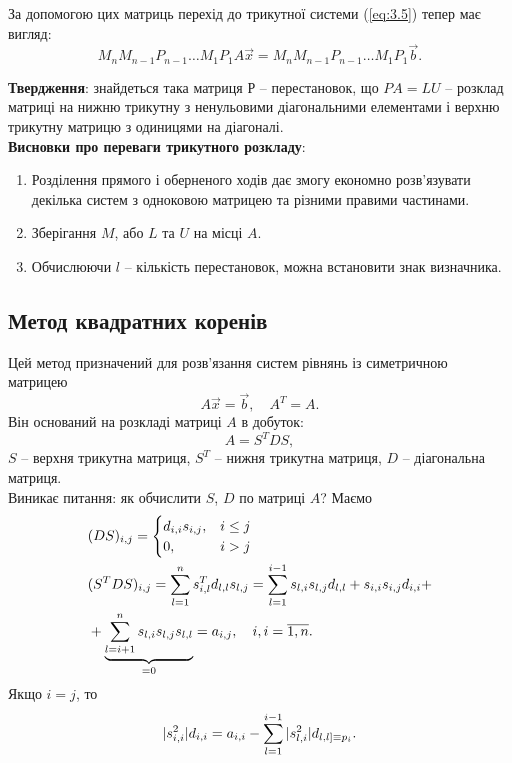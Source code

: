 За допомогою цих матриць перехід до трикутної системи (\ref{eq:3.5}) тепер має вигляд: \[ M_n M_{n-1} P_{n-1} \ldots M_1 P_1 A \vec x = M_n M_{n-1} P_{n-1} \ldots M_1 P_1 \vec b. \]

\textbf{Твердження}: знайдеться така матриця $Р$ -- перестановок, що $PA = LU$ -- розклад матриці на нижню трикутну з ненульовими діагональними елементами і верхню трикутну матрицю з одиницями на діагоналі. \\

\textbf{Висновки про переваги трикутного розкладу}:
\begin{enumerate}
	\item Розділення прямого і оберненого ходів дає змогу економно розв'язувати декілька систем з одноковою матрицею та різними правими частинами.
	\item Зберігання $M$, або $L$ та $U$ на місці $A$.
	\item Обчислюючи $l$ -- кількість перестановок, можна встановити знак визначника.
\end{enumerate}

\subsection{Метод квадратних коренів}
Цей метод призначений для розв'язання систем рівнянь із симетричною матрицею
\begin{equation}
	\label{eq:3.6}
	A \vec x = \vec b, \quad A^T = A.
\end{equation}
Він оснований на розкладі матриці $A$ в добуток:
\begin{equation}
	\label{eq:3.7}
	A = S^T D S,
\end{equation}
$S$ -- верхня трикутна матриця, $S^T$ -- нижня трикутна матриця, $D$ -- діагональна матриця. \\

Виникає питання: як обчислити $S$, $D$ по матриці $A$? Маємо
\begin{equation}
	\label{eq:3.8}
	\begin{aligned}
		& (DS)_{i,j} = \begin{cases} d_{i,i}s_{i,j}, & i \le j \\ 0, & i > j \end{cases} \\
		& (S^TDS)_{i,j} = \displaystyle\sum\limits_{l=1}^n s_{i,l}^T d_{l,l} s_{l, j} = \displaystyle\sum\limits_{l=1}^{i-1} s_{l,i} s_{l, j} d_{l, l} + s_{i,i} s_{i,j} d_{i,i} + \\
		& +\underset{=0}{\underbrace{\displaystyle\sum\limits_{l=i+1}^n s_{l, i} s_{l, j} s_{l,l}}} = a_{i,j}, \quad i,i = \overline{1,n}. 
	\end{aligned}
\end{equation}
Якщо $i = j$, то \[ |s_{i,i}^2|d_{i,i} = a_{i,i} - \displaystyle\sum\limits_{l=1}^{i-1} |s_{l,i}^2| d_{l,l] \equiv p_i}.\]

